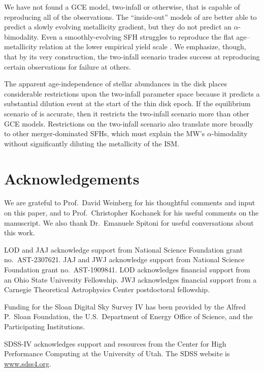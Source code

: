 \documentclass[twocolumn,twocolappendix,linenumbers]{aastex631}
\begin{document}
We have not found a GCE model, two-infall or otherwise, that is capable of reproducing all of the observations. The ``inside-out'' models of \citet{johnson_stellar_2021} are better able to predict a slowly evolving metallicity gradient, but they do not predict an $\alpha$-bimodality. Even a smoothly-evolving SFH struggles to reproduce the flat age--metallicity relation at the lower empirical yield scale \citep{johnson_milky_2024}. We emphasize, though, that by its very construction, the two-infall scenario trades success at reproducing certain observations for failure at others.

The apparent age-independence of stellar abundances in the disk places considerable restrictions upon the two-infall parameter space because it predicts a substantial dilution event at the start of the thin disk epoch. If the equilibrium scenario of \citet{johnson_milky_2024} is accurate, then it restricts the two-infall scenario more than other GCE models. Restrictions on the two-infall scenario also translate more broadly to other merger-dominated SFHs, which must explain the MW's $\alpha$-bimodality without significantly diluting the metallicity of the ISM.

\section*{Acknowledgements}

We are grateful to Prof.\ David Weinberg for his thoughtful comments and input on this paper, and to Prof.\ Christopher Kochanek for his useful comments on the manuscript. We also thank Dr.\ Emanuele Spitoni for useful conversations about this work.

LOD and JAJ acknowledge support from National Science Foundation grant no.\ AST-2307621. JAJ and JWJ acknowledge support from National Science Foundation grant no.\ AST-1909841.
LOD acknowledges financial support from an Ohio State University Fellowship.
JWJ acknowledges financial support from a Carnegie Theoretical Astrophysics Center postdoctoral fellowship.

Funding for the Sloan Digital Sky 
Survey IV has been provided by the 
Alfred P.\ Sloan Foundation, the U.S.\ 
Department of Energy Office of 
Science, and the Participating 
Institutions. 

SDSS-IV acknowledges support and 
resources from the Center for High 
Performance Computing  at the 
University of Utah. The SDSS 
website is \url{www.sdss4.org}.
\end{document}
